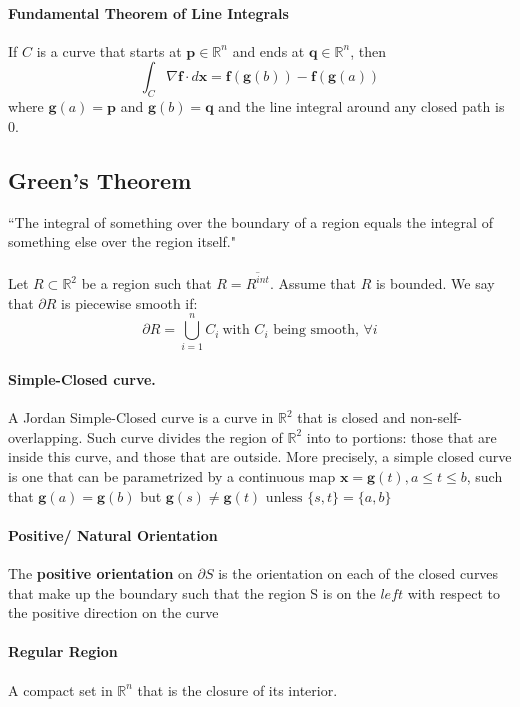 \documentclass[11pt]{article}
\newcommand{\tb}[1]{\textbf{#1}}
\newcommand{\real}[0]{\mathbb{R}}
\newcommand{\vx}[0]{\tb{x}}
\begin{document}
\paragraph{Fundamental Theorem of Line Integrals}
If $C$ is a curve that starts at $\tb{p} \in \real^n$ and ends at $\tb{q}\in \real^n$, then
$$\int_C \nabla\tb{f}\cdot d\vx = \tb{f}(\tb{g}(b)) - \tb{f}(\tb{g}(a))$$
where $\tb{g}(a) = \tb{p}$ and $\tb{g}(b) = \tb{q}$ and the line integral around any closed path is 0.

\subsection{Green's Theorem} 
``The integral of something over the boundary of a region equals the integral of something else over the region itself."\\\\
Let $R\subset \real^2$ be a region such that $R = \overline{R^{int}}$. Assume that $R$ is bounded. We say that $\partial R$ is piecewise smooth if:
\begin{equation*}
    \partial R = \bigcup_{i = 1}^n C_i~\text{with $C_i$ being smooth, $\forall i$}
\end{equation*}

\paragraph{Simple-Closed curve.}
A Jordan Simple-Closed curve is a curve in $\real^2$ that is closed and non-self-overlapping. Such curve divides the region of $\real^2$ into to portions: those that are inside this curve, and those that are outside.
More precisely, a simple closed curve is one that can be parametrized by a continuous map $\vx = \tb{g}(t), a\leq t \leq b$, such that $\tb{g}(a) = \tb{g}(b)$ but $\tb{g}(s) \neq \tb{g}(t) \mbox{ unless } \{s,t\} = \{a, b\}$
\paragraph{Positive/ Natural Orientation} The \tb{positive orientation} on $\partial S$ is the orientation on each of the closed curves that make up the boundary such that the region S is on the $left$ with respect to the positive direction on the curve

\paragraph{Regular Region}
A compact set in $\real^n$ that is the closure of its interior.
\end{document}
